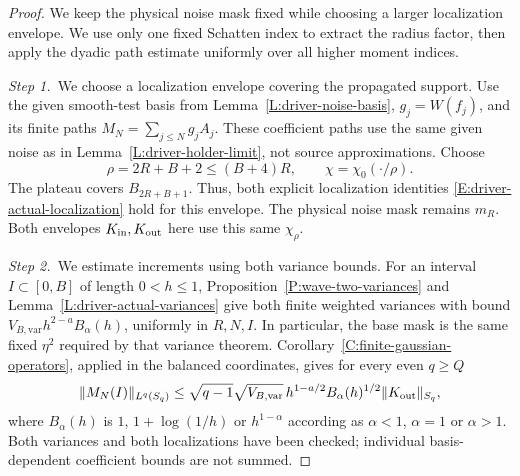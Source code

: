 \begin{proof}
  We keep the physical noise mask fixed while choosing a larger localization
  envelope. We use only one fixed Schatten index to extract the radius factor,
  then apply the dyadic path estimate uniformly over all higher moment
  indices.


  \medskip
  \noindent\textit{Step 1.~}We choose a localization envelope covering the
  propagated support.
  Use the given smooth-test basis from Lemma~\ref{L:driver-noise-basis}, $g_j =
  W(f_j)$, and its finite paths $M_N = \sum_{j\le N}g_jA_j$. These coefficient
  paths use the same given noise as in Lemma~\ref{L:driver-holder-limit}, not
  source approximations. Choose
  \[
    \rho=2R+B+2\le(B+4)R,\qquad \chi=\chi_0(\cdot/\rho).
  \]
  The plateau covers $B_{2R+B+1}$. Thus, both explicit localization identities
  \eqref{E:driver-actual-localization} hold for this envelope. The physical
  noise mask remains $m_R$. Both envelopes $K_{\rm in},K_{\rm out}$ here use
  this same $\chi_\rho$.


  \medskip
  \noindent\textit{Step 2.~}We estimate increments using both variance bounds.
  For an interval $I \subset [0,B]$ of length $0 < h \le 1$,
  Proposition~\ref{P:wave-two-variances} and
  Lemma~\ref{L:driver-actual-variances} give both finite weighted variances with
  bound $V_{B,\mathrm{var}}h^{2-a}B_\alpha(h)$, uniformly in $R,N,I$. In
  particular, the base mask is the same fixed $\eta^2$ required by that variance
  theorem. Corollary~\ref{C:finite-gaussian-operators}, applied in the balanced
  coordinates, gives for every even $q \ge Q$
  \[
    \|M_N(I)\|_{L^q(S_q)}
    \le\sqrt{q-1}\sqrt{V_{B,\mathrm{var}}}\,
    h^{1-a/2}B_\alpha(h)^{1/2}\|K_{\rm out}\|_{S_q},
  \]
  where $B_\alpha(h)$ is $1$, $1+\log(1/h)$ or $h^{1-\alpha}$ according as
  $\alpha < 1$, $\alpha = 1$ or $\alpha > 1$. Both variances and both
  localizations have been checked; individual basis-dependent coefficient bounds
  are not summed.



\end{proof}
